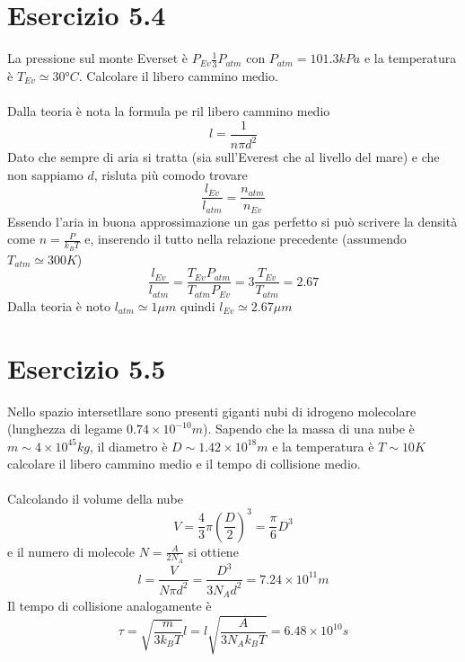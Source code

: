 \documentclass[a4paper]{article}
\begin{document}
    \section*{Esercizio 5.4}
        La pressione sul monte Everset è $P_{Ev}\frac{1}{3}P_{atm}$ con $P_{atm}=101.3kPa$ e la temperatura è $T_{Ev}\simeq 30°C$.
        Calcolare il libero cammino medio.
        \\
        \\
        Dalla teoria è nota la formula pe ril libero cammino medio
        \begin{equation*}
            l=\frac{1}{n\pi d^2}
        \end{equation*}
        Dato che sempre di aria si tratta (sia sull'Everest che al livello del mare) e che non sappiamo $d$, risluta più comodo trovare
        \begin{equation*}
            \frac{l_{Ev}}{l_{atm}}=\frac{n_{atm}}{n_{Ev}}
        \end{equation*}
        Essendo l'aria in buona approssimazione un gas perfetto si può scrivere la densità come $n=\frac{P}{k_BT}$ e, inserendo il tutto nella relazione precedente (assumendo $T_{atm}\simeq300K$)
        \begin{equation*}
            \frac{l_{Ev}}{l_{atm}}=\frac{T_{Ev}P_{atm}}{T_{atm}P_{Ev}}=3\frac{T_{Ev}}{T_{atm}}=2.67
        \end{equation*}
        Dalla teoria è noto $l_{atm}\simeq 1\mu m$ quindi $l_{Ev}\simeq 2.67\mu m$

    \section*{Esercizio 5.5}
        Nello spazio intersetllare sono presenti giganti nubi di idrogeno molecolare (lunghezza di legame $0.74\times 10^{-10}m$).
        Sapendo che la massa di una nube è $m\sim 4\times 10^{45}kg$, il diametro è $D\sim 1.42\times 10^{18}m$ e la temperatura è $T\sim 10K$ calcolare il libero cammino medio e il tempo di collisione medio.
        \\
        \\
        Calcolando il volume della nube
        \begin{equation*}
            V=\frac{4}{3}\pi\left(\frac{D}{2}\right)^3=\frac{\pi}{6}D^3
        \end{equation*}
        e il numero di molecole $N=\frac{A}{2N_A}$ si ottiene
        \begin{equation*}
            l=\frac{V}{N\pi d^2}=\frac{D^3}{3N_Ad^2}=7.24\times 10^{11}m
        \end{equation*}
        Il tempo di collisione analogamente è
        \begin{equation*}
            \tau=\sqrt{\frac{m}{3k_BT}}l=l\sqrt{\frac{A}{3N_Ak_BT}}=6.48\times 10^{10}s
        \end{equation*}
\end{document}
